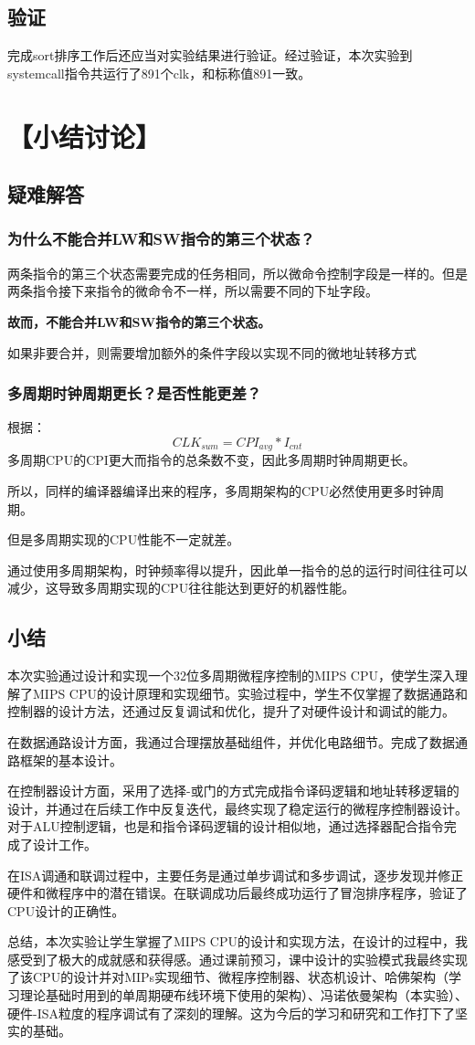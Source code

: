 \documentclass[withoutpreface]{cumcmthesis} %
\begin{document}
\subsection{验证}
完成sort排序工作后还应当对实验结果进行验证。经过验证，本次实验到systemcall指令共运行了891个clk，和标称值891一致。

\section{【小结讨论】}
\subsection{疑难解答}
\subsubsection{为什么不能合并LW和SW指令的第三个状态？}
两条指令的第三个状态需要完成的任务相同，所以微命令控制字段是一样的。但是两条指令接下来指令的微命令不一样，所以需要不同的下址字段。

\textbf{故而，不能合并LW和SW指令的第三个状态。}

如果非要合并，则需要增加额外的条件字段以实现不同的微地址转移方式
\subsubsection{多周期时钟周期更长？是否性能更差？}
根据：
\begin{equation}
CLK_{sum}=CPI_{avg}*I_{cnt}
\end{equation}
多周期CPU的CPI更大而指令的总条数不变，因此多周期时钟周期更长。

所以，同样的编译器编译出来的程序，多周期架构的CPU必然使用更多时钟周期。

但是多周期实现的CPU性能不一定就差。

通过使用多周期架构，时钟频率得以提升，因此单一指令的总的运行时间往往可以减少，这导致多周期实现的CPU往往能达到更好的机器性能。
\subsection{小结}
本次实验通过设计和实现一个32位多周期微程序控制的MIPS CPU，使学生深入理解了MIPS CPU的设计原理和实现细节。实验过程中，学生不仅掌握了数据通路和控制器的设计方法，还通过反复调试和优化，提升了对硬件设计和调试的能力。

在数据通路设计方面，我通过合理摆放基础组件，并优化电路细节。完成了数据通路框架的基本设计。

在控制器设计方面，采用了选择-或门的方式完成指令译码逻辑和地址转移逻辑的设计，并通过在后续工作中反复迭代，最终实现了稳定运行的微程序控制器设计。对于ALU控制逻辑，也是和指令译码逻辑的设计相似地，通过选择器配合指令完成了设计工作。

在ISA调通和联调过程中，主要任务是通过单步调试和多步调试，逐步发现并修正硬件和微程序中的潜在错误。在联调成功后最终成功运行了冒泡排序程序，验证了CPU设计的正确性。

总结，本次实验让学生掌握了MIPS CPU的设计和实现方法，在设计的过程中，我感受到了极大的成就感和获得感。通过课前预习，课中设计的实验模式我最终实现了该CPU的设计并对MIPs实现细节、微程序控制器、状态机设计、哈佛架构（学习理论基础时用到的单周期硬布线环境下使用的架构）、冯诺依曼架构（本实验）、硬件-ISA粒度的程序调试有了深刻的理解。这为今后的学习和研究和工作打下了坚实的基础。
\end{document}
